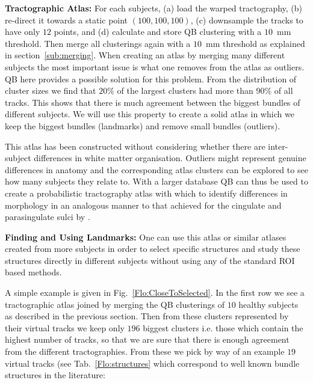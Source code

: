 \documentclass[preprint,authoryear,a4paper,10pt,onecolumn]{elsarticle}
\begin{document}
\textbf{Tractographic Atlas:} For each subjects, (a) load the warped
tractography, (b) re-direct it towards a static point $(100,100,100)$, 
(c) downsample the tracks to have only $12$ points, and (d) calculate
and store QB clustering with a $10$~mm threshold. Then merge all
clusterings again with a $10$~mm threshold as explained in
section~\ref{sub:merging}. When creating an atlas by merging
many different subjects the most important issue is what one removes
from the atlas as outliers.  QB here provides a possible solution for
this problem. From the distribution of cluster sizes we find that $20\%$
of the largest clusters had more than $90\%$ of all tracks. This shows
that there is much agreement between the biggest bundles of different
subjects.  We will use this property to create a solid atlas in which we
keep the biggest bundles (landmarks) and remove small bundles
(outliers).

This atlas has been constructed without considering whether there are
inter-subject differences in white matter organisation. Outliers might
represent genuine differences in anatomy and the corresponding atlas
clusters can be explored to see how many subjects they relate to. With a
larger database QB can thus be used to create a probabilistic
tractography atlas with which to identify differences in morphology in
an analogous manner to that achieved for the cingulate and parasingulate
sulci by \citet{paus1996human}.

\textbf{Finding and Using Landmarks:} One can use this atlas or similar
atlases created from more subjects in order to select specific
structures and study these structures directly in different subjects
without using any of the standard ROI based methods.

A simple example is given in Fig.~\ref{Flo:CloseToSelected}. In the
first row we see a tractographic atlas joined by merging the QB
clusterings of $10$ healthy subjects as described in the previous
section. Then from these clusters represented by their virtual tracks we
keep only $196$ biggest clusters i.e. those which contain the highest
number of tracks, so that we are sure that there is enough agreement
from the different tractographies. From these we pick by way of an
example $19$ virtual tracks (see Tab.~\ref{Flo:structures} which
correspond to well known bundle structures in the literature:
\end{document}
